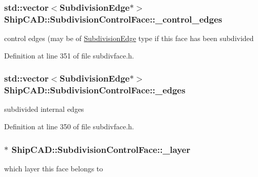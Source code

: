 \hypertarget{classShipCAD_1_1SubdivisionControlFace_a33d7e2ecd5f42edf5492efb83df3856b}{
\subsubsection[{\-\_\-control\-\_\-edges}]{\setlength{\rightskip}{0pt plus 5cm}std\-::vector$<${\bf Subdivision\-Edge}$\ast$$>$ Ship\-C\-A\-D\-::\-Subdivision\-Control\-Face\-::\-\_\-control\-\_\-edges\hspace{0.3cm}{\ttfamily [protected]}}}\label{classShipCAD_1_1SubdivisionControlFace_a33d7e2ecd5f42edf5492efb83df3856b}
control edges (may be of \hyperlink{classShipCAD_1_1SubdivisionEdge}{Subdivision\-Edge} type if this face has been subdivided 

Definition at line 351 of file subdivface.\-h.

\hypertarget{classShipCAD_1_1SubdivisionControlFace_a390f626d9999ab3ce48878b223ea1693}{
\subsubsection[{\-\_\-edges}]{\setlength{\rightskip}{0pt plus 5cm}std\-::vector$<${\bf Subdivision\-Edge}$\ast$$>$ Ship\-C\-A\-D\-::\-Subdivision\-Control\-Face\-::\-\_\-edges\hspace{0.3cm}{\ttfamily [protected]}}}\label{classShipCAD_1_1SubdivisionControlFace_a390f626d9999ab3ce48878b223ea1693}
subdivided internal edges 

Definition at line 350 of file subdivface.\-h.

\hypertarget{classShipCAD_1_1SubdivisionControlFace_aee1990d4db7127ba59117a65c1a6ce7e}{
\subsubsection[{\-\_\-layer}]{$\ast$ Ship\-C\-A\-D\-::\-Subdivision\-Control\-Face\-::\-\_\-layer\hspace{0.3cm}{\ttfamily [protected]}}}\label{classShipCAD_1_1SubdivisionControlFace_aee1990d4db7127ba59117a65c1a6ce7e}
which layer this face belongs to 

